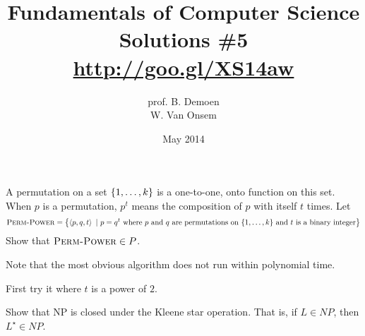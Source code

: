 \documentclass{article}
\title{Fundamentals of Computer Science\\Solutions \#5\\\url{http://goo.gl/XS14aw}}
\author{prof. B. Demoen\\W. Van Onsem}
\date{May 2014}
\begin{document}
\maketitle
\begin{exercise}
A permutation on a set $\left\{ 1,\ldots,k \right\}$ is a one-to-one, onto function on this set. When $p$ is a permutation, $p^t$ means the composition of $p$ with itself $t$ times. Let
\begin{equation}
\mbox{\textsc{Perm-Power}}=\left\{ \left\langle p, q, t \right\rangle\ |\ p = q^t\mbox{ where $p$ and $q$ are permutations on $\left\{ 1,\ldots,k \right\}$ and $t$ is a binary integer} \right\}
\end{equation}
Show that $\mbox{\textsc{Perm-Power}}\in P$.
\begin{note}
Note that the most obvious algorithm does not run within polynomial time.
\end{note}
\begin{hint}
First try it where $t$ is a power of $2$.
\end{hint}
\begin{answer}

\end{answer}
\end{exercise}

\begin{exercise}
Show that NP is closed under the Kleene star operation. That is, if $L\in NP$, then $L^{\star}\in NP$.
\begin{answer}

\end{answer}
\end{exercise}
\end{document}
